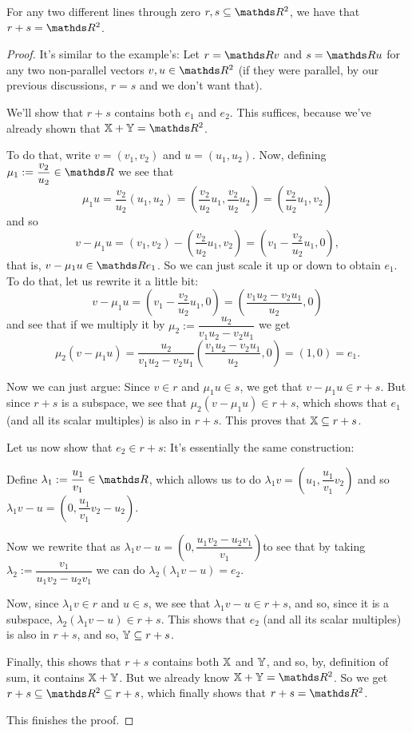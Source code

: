\begin{lemma}
	For any two different lines through zero $r,s\subseteq \R^2$, we have that $r+s=\R^2$.
\end{lemma}
\begin{proof}
	It's similar to the example's: Let $r=\R v$ and $s=\R u$ for any two non-parallel vectors $v,u\in \R^2$ (if they were parallel, by our previous discussions, $r=s$ and we don't want that).
	
	We'll show that $r+s$ contains both $e_1$ and $e_2$. This suffices, because we've already shown that $\mb X+\mb Y=\R^2$.
	
	To do that, write $v=(v_1,v_2)$ and $u=(u_1,u_2)$. Now, defining $\mu_1:=\dfrac{v_2}{u_2}\in\R$ we see that $$\mu_1 u=\dfrac{v_2}{u_2}(u_1,u_2)=\left(\frac{v_2}{u_2}u_1,\frac{v_2}{u_2}u_2\right)=\left(\frac{v_2}{u_2}u_1,v_2\right)$$and so
	\[v-\mu_1u=(v_1,v_2)-\left(\frac{v_2}{u_2}u_1,v_2\right)=\left(v_1-\frac{v_2}{u_2}u_1,0\right),\]that is, $v-\mu_1u\in \R e_1$. So we can just scale it up or down to obtain $e_1$. To do that, let us rewrite it a little bit:
	\[v-\mu_1u=\left(v_1-\frac{v_2}{u_2}u_1,0\right)=\left(\frac{v_1u_2-v_2u_1}{u_2},0\right)\]and see that if we multiply it by $\mu_2:=\dfrac{u_2}{v_1u_2-v_2u_1}$ we get
	\[\mu_2(v-\mu_1u)=\dfrac{u_2}{v_1u_2-v_2u_1}\left(\frac{v_1u_2-v_2u_1}{u_2},0\right)=(1,0)=e_1.\]
	
	Now we can just argue: Since $v\in r$ and $\mu_1u\in s$, we get that $v-\mu_1u\in r+s$. But since $r+s$ is a subspace, we see that $\mu_2(v-\mu_1u)\in r+s$, which shows that $e_1$ (and all its scalar multiples) is also in $r+s$. This proves that $\mathbb X\subseteq r+s$.
	
	\bigskip
	Let us now show that $e_2\in r+s$: It's essentially the same construction:
	
	Define $\lambda_1:=\dfrac{u_1}{v_1}\in \R$, which allows us to do $\lambda_1v=\left(u_1,\dfrac{u_1}{v_1}v_2\right)$ and so $\lambda_1v-u=\left(0,\dfrac{u_1}{v_1}v_2-u_2\right)$. 
	
	Now we rewrite that as $\lambda_1v-u=\left(0,\dfrac{u_1v_2-u_2v_1}{v_1}\right)$to see that by taking $\lambda_2:=\dfrac{v_1}{u_1v_2-u_2v_1}$ we can do $\lambda_2(\lambda_1v-u)=e_2$.
	
	Now, since $\lambda_1v\in r$ and $u\in s$, we see that $\lambda_1v-u\in r+s$, and so, since it is a subspace, $\lambda_2(\lambda_1v-u)\in r+s$. This shows that $e_2$ (and all its scalar multiples) is also in $r+s$, and so, $\mathbb Y\subseteq r+s$.
	
	\bigskip
	Finally, this shows that $r+s$ contains both $\mathbb X$ and $\mathbb Y$, and so, by, definition of sum, it contains $\mathbb X+\mathbb Y$. But we already know $\mb X+\mb Y=\R^2$. So we get $r+s\subseteq\R^2\subseteq r+s$, which finally shows that $r+s=\R^2$.
	
	This finishes the proof.
\end{proof}

